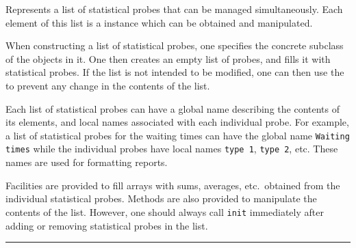 
Represents a list of statistical probes that
can be managed simultaneously.
Each element of this list is a 
instance which can be obtained and manipulated.

When constructing a list of statistical probes, one specifies the
concrete subclass of the  objects in it.
One then creates an empty list of probes, and fills
it with statistical probes.
If the list is not intended to be modified, one can then use the
 to prevent any change in the contents of
the list.

Each list of statistical probes can have a global name describing
the contents of its elements, and local names associated with each
individual probe.  For example, a list of statistical probes for
the waiting times can have the global name \texttt{Waiting times}
while the individual probes have local names \texttt{type 1},
\texttt{type 2}, etc.  These names are used for formatting reports.

Facilities are provided to fill arrays with sums, averages, etc.\ obtained
from the individual statistical probes.
Methods are also provided to manipulate the contents of the list.
However, one should always call \texttt{init} immediately after adding or
removing statistical probes in the list.

\bigskip\hrule

